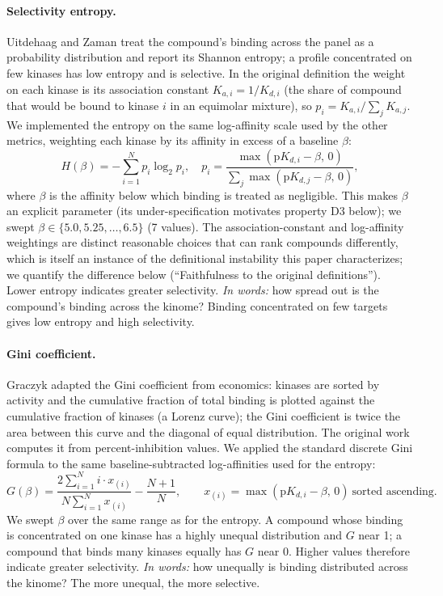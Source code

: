\documentclass[journal=jcisd8,manuscript=article]{achemso}
\begin{document}
\paragraph{Selectivity entropy.}
Uitdehaag and Zaman\cite{Uitdehaag2011} treat the compound's binding across the
panel as a probability distribution and report its Shannon entropy; a profile
concentrated on few kinases has low entropy and is selective.
In the original definition the weight on each kinase is its association constant
$K_{a,i} = 1/K_{d,i}$ (the share of compound that would be bound to kinase $i$
in an equimolar mixture), so $p_i = K_{a,i}/\sum_j K_{a,j}$.
We implemented the entropy on the same log-affinity scale used by the other
metrics, weighting each kinase by its affinity in excess of a baseline $\beta$:
\begin{equation}
  H(\beta) = -\sum_{i=1}^{N} p_i \log_2 p_i, \quad
  p_i = \frac{\max(\mathrm{p}K_{d,i} - \beta,\, 0)}
             {\sum_j \max(\mathrm{p}K_{d,j} - \beta,\, 0)},
\end{equation}
where $\beta$ is the affinity below which binding is treated as negligible.
This makes $\beta$ an explicit parameter (its under-specification motivates
property D3 below); we swept $\beta \in \{5.0, 5.25, \ldots, 6.5\}$ (7 values).
The association-constant and log-affinity weightings are distinct reasonable
choices that can rank compounds differently, which is itself an instance of the
definitional instability this paper characterizes; we quantify the difference
below (``Faithfulness to the original definitions'').
Lower entropy indicates greater selectivity.
\emph{In words:} how spread out is the compound's binding across the kinome?
Binding concentrated on few targets gives low entropy and high selectivity.

\paragraph{Gini coefficient.}
Graczyk\cite{Graczyk2010} adapted the Gini coefficient from economics: kinases
are sorted by activity and the cumulative fraction of total binding is plotted
against the cumulative fraction of kinases (a Lorenz curve); the Gini
coefficient is twice the area between this curve and the diagonal of equal
distribution.
The original work computes it from percent-inhibition values.
We applied the standard discrete Gini formula to the same baseline-subtracted
log-affinities used for the entropy:
\begin{equation}
  G(\beta) = \frac{2\sum_{i=1}^{N} i \cdot x_{(i)}}{N \sum_{i=1}^{N} x_{(i)}} - \frac{N+1}{N},
  \qquad x_{(i)} = \max(\mathrm{p}K_{d,i} - \beta,\, 0)\ \text{sorted ascending}.
\end{equation}
We swept $\beta$ over the same range as for the entropy.
A compound whose binding is concentrated on one kinase has a highly unequal
distribution and $G$ near 1; a compound that binds many kinases equally has
$G$ near 0.
Higher values therefore indicate greater selectivity.
\emph{In words:} how unequally is binding distributed across the kinome?
The more unequal, the more selective.
\end{document}
